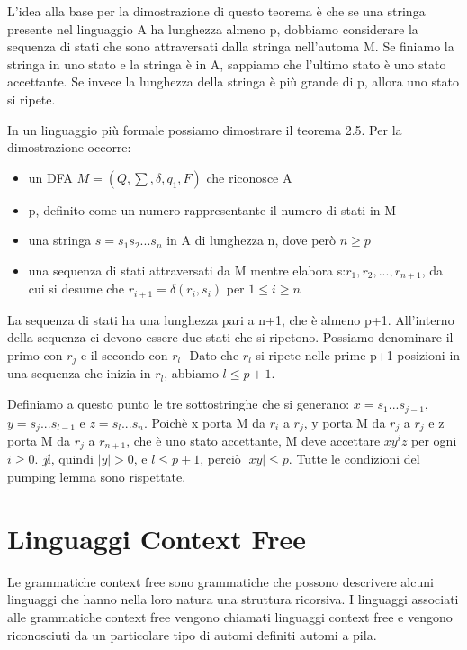\documentclass[a4paper]{extarticle}
\begin{document}
L'idea alla base per la dimostrazione di questo teorema è che se una stringa presente nel linguaggio A ha lunghezza almeno p, dobbiamo considerare la sequenza di stati che sono attraversati dalla stringa nell'automa M. Se finiamo la stringa in uno stato e la stringa è in A, sappiamo che l'ultimo stato è uno stato accettante. Se invece la lunghezza della stringa è più grande di p, allora uno stato si ripete. 

In un linguaggio più formale possiamo dimostrare il teorema 2.5.
Per la dimostrazione occorre:
\begin{itemize}
\item un DFA $M=(Q,\sum,\delta,q_1,F)$ che riconosce A
\item p, definito come un numero rappresentante il numero di stati in M
\item una stringa $s=s_1s_2...s_n$ in A di lunghezza n, dove però $n\geq p$
\item una sequenza di stati attraversati da M mentre elabora s:$r_1,r_2,...,r_{n+1}$, da cui si desume che $r_{i+1}=\delta (r_i,s_i)$ per $1\leq i\geq n$
\end{itemize}

La sequenza di stati ha una lunghezza pari a n+1, che è almeno p+1. All'interno della sequenza ci devono essere due stati che si ripetono. Possiamo denominare il primo con $r_j$ e il secondo con $r_l$- Dato che $r_l$ si ripete nelle prime p+1 posizioni in una sequenza che inizia in $r_l$, abbiamo $l\leq p+1$.

Definiamo a questo punto le tre sottostringhe che si generano: $x=s_1...s_{j-1}$, $y=s_j...s_{l-1}$ e $z=s_l...s_n$. Poichè x porta M da $r_i$ a $r_j$, y porta M da $r_j$ a $r_j$ e z porta M da $r_j$ a $r_{n+1}$, che è uno stato accettante, M deve accettare $xy^iz$ per ogni $i\geq 0$. $j \not l$, quindi $|y|>0$, e $l\leq p+1$, perciò $|xy|\leq p$. Tutte le condizioni del pumping lemma sono rispettate.

\newpage
\section{Linguaggi Context Free}

Le grammatiche context free sono grammatiche che possono descrivere alcuni linguaggi che hanno nella loro natura una struttura ricorsiva. I linguaggi associati alle grammatiche context free vengono chiamati linguaggi context free e vengono riconosciuti da un particolare tipo di automi definiti automi a pila.
\end{document}

